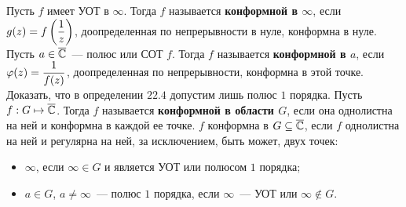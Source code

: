 \Def
Пусть $f$ имеет УОТ в $\infty$. Тогда $f$ называется \textbf{конформной в
  $\infty$}, если $g(z) = f\left( \displaystyle \frac{1}{z} \right)$, доопределенная по
непрерывности в нуле, конформна в нуле.
\Def
Пусть $a \in \overline{\mathbb{C}}$~--- полюс или СОТ $f$. Тогда $f$ называется
\textbf{конформной в $a$}, если $\varphi(z) = \displaystyle \frac{1}{f(z)}$,
доопределенная по непрерывности, конформна в этой точке.
\Exse
Доказать, что в определении $22.4$ допустим лишь полюс $1$ порядка.
\Def
Пусть $f: G \mapsto \overline{\mathbb{C}}$. Тогда $f$ называется \textbf{конформной в области
  $G$}, если она однолистна на ней и конформна в каждой ее точке.
\prop
$f$ конформна в $G \subseteq \overline{\mathbb{C}}$, если $f$ однолистна на ней и регулярна на
ней, за исключением, быть может, двух точек:
\begin{itemize}
    \item $\infty$, если $\infty \in G$ и является УОТ или полюсом $1$ порядка;
    \item $a \in G$, $a \neq \infty$~--- полюс $1$ порядка, если $\infty$~---
    УОТ или $\infty \not \in G$.
\end{itemize}

